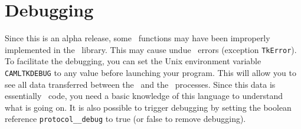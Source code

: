 \section{Debugging}
Since this is an alpha release, some \tk\ functions may have been improperly
implemented in the \caml\ library. This may cause undue \tk\ errors
(exception \verb|TkError|). To facilitate the debugging, you can set the
Unix environment variable \verb|CAMLTKDEBUG| to any value before launching
your program. This will allow you to see all
data transferred between the \caml\ and the \tk\ processes. Since this data is
essentially \tcl\tk\ code, you need a basic knowledge of this language to
understand what is going on.
It is also possible to trigger debugging by setting the boolean reference
\verb|protocol__debug| to true (or false to remove debugging).
